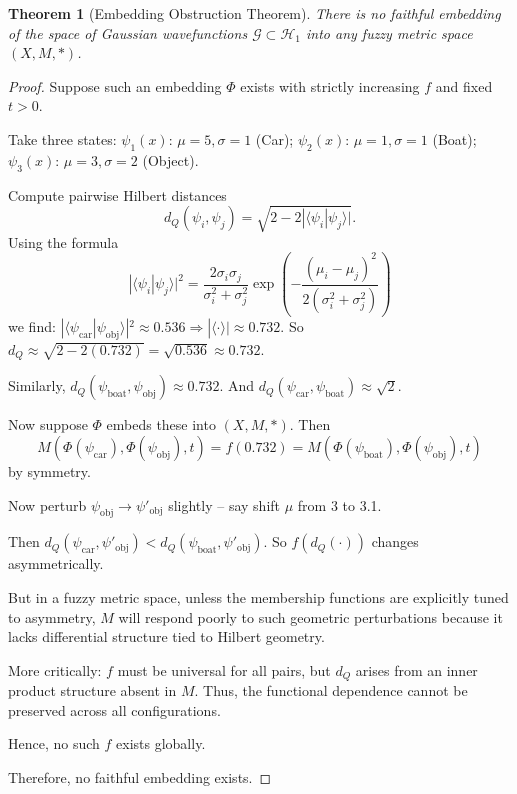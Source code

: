 \documentclass{article}
\newtheorem{theorem}{Theorem}
\begin{document}
\begin{theorem}[Embedding Obstruction Theorem]
There is no faithful embedding of the space of Gaussian wavefunctions $\mathcal{G} \subset \mathcal{H}_1$ into any fuzzy metric space $(X,M,*)$.
\end{theorem}

\begin{proof}
Suppose such an embedding $\Phi$ exists with strictly increasing $f$ and fixed $t>0$.

Take three states:
$\psi_1(x)$: $\mu=5, \sigma=1$ (Car);
$\psi_2(x)$: $\mu=1, \sigma=1$ (Boat);
$\psi_3(x)$: $\mu=3, \sigma=2$ (Object).

Compute pairwise Hilbert distances
$$
d_Q(\psi_i,\psi_j) = \sqrt{2 - 2|\langle\psi_i|\psi_j\rangle|} .
$$
Using the  formula
$$
|\langle\psi_i|\psi_j\rangle|^2 = \frac{2\sigma_i\sigma_j}{\sigma_i^2 + \sigma_j^2} \exp\left(-\frac{(\mu_i - \mu_j)^2}{2(\sigma_i^2 + \sigma_j^2)}\right) 
$$
we find:
$|\langle\psi_{\text{car}}|\psi_{\text{obj}}\rangle|^2 \approx 0.536 \Rightarrow |\langle\cdot\rangle| \approx 0.732$.
 So $d_Q \approx \sqrt{2 - 2(0.732)} = \sqrt{0.536} \approx 0.732$.

Similarly, $d_Q(\psi_{\text{boat}},\psi_{\text{obj}}) \approx 0.732$.
And $d_Q(\psi_{\text{car}},\psi_{\text{boat}}) \approx \sqrt{2}$.

Now suppose $\Phi$ embeds these into $(X,M,*)$. Then
$$
M(\Phi(\psi_{\text{car}}), \Phi(\psi_{\text{obj}}), t) = f(0.732) = M(\Phi(\psi_{\text{boat}}), \Phi(\psi_{\text{obj}}), t)
$$
by symmetry.

Now perturb $\psi_{\text{obj}} \to \psi'_{\text{obj}}$ slightly -- say shift $\mu$ from 3 to 3.1.

Then $d_Q(\psi_{\text{car}}, \psi'_{\text{obj}}) < d_Q(\psi_{\text{boat}}, \psi'_{\text{obj}})$.
So $f(d_Q(\cdot))$ changes asymmetrically.

But in a fuzzy metric space, unless the membership functions are explicitly tuned to asymmetry, $M$ will respond poorly to such geometric perturbations because it lacks differential structure tied to Hilbert geometry.

More critically: $f$ must be universal for all pairs, but $d_Q$ arises from an inner product structure absent in $M$. Thus, the functional dependence cannot be preserved across all configurations.

Hence, no such $f$ exists globally.

Therefore, no faithful embedding exists.
\end{proof}
\end{document}
